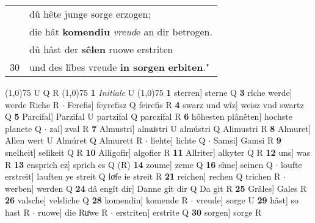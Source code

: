 \documentclass[8pt,a4paper,notitlepage]{article}
\begin{document}
\begin{table}[ht]
\begin{minipage}[t]{0.5\linewidth}
\begin{tabular}{rl}
 & dû hête junge sorge erzogen;\\ 
 & die hât \textbf{komendiu} \textit{vreud}e an dir betrogen.\\ 
 & dû hâst der \textbf{sêlen} ruowe erstriten\\ 
30 & und des lîbes vreude \textbf{in sorgen} \textbf{erbiten}."\\ 
\end{tabular}
\scriptsize
\line(1,0){75} \newline
U Q R \newline
\line(1,0){75} \newline
\textbf{1} \textit{Initiale} U  \newline
\line(1,0){75} \newline
\textbf{1} sterren] sterne Q \textbf{3} rîche werde] werde Riche R  $\cdot$ Ferefis] feyrefisz Q feirefis R \textbf{4} swarz und wîz] weisz vnd swartz Q \textbf{5} Parcifal] Parzifal U partzifal Q parczifal R \textbf{6} hôhesten plânêten] hochste planete Q  $\cdot$ zal] zval R \textbf{7} Almustri] almuͦstri U almústri Q Alimustri R \textbf{8} Almuret] Allen wert U Almúret Q Almurett R  $\cdot$ liehte] lichte Q  $\cdot$ Samsi] Gamsi R \textbf{9} snelheit] selikeit Q R \textbf{10} Alligofir] algofier R \textbf{11} Allriter] alkyter Q R \textbf{12} uns] was R \textbf{13} ensprich ez] sprich es Q (R) \textbf{14} zoume] zeme Q \textbf{16} sîme] seinen Q  $\cdot$ loufte erstreit] lauften ye streit Q loͯfe ie streit R \textbf{21} reichen] rechen Q trichen R  $\cdot$ werben] werden Q \textbf{24} dâ engît dir] Danne git dir Q Da git R \textbf{25} Grâles] Gales R \textbf{26} valsche] velsliche Q \textbf{28} komendiu] komende R  $\cdot$ vreude] sorge U \textbf{29} hâst] so hast R  $\cdot$ ruowe] die Ruͦwe R  $\cdot$ erstriten] erstrite Q \textbf{30} sorgen] sorge R \newline
\end{minipage}
\end{table}
\end{document}
